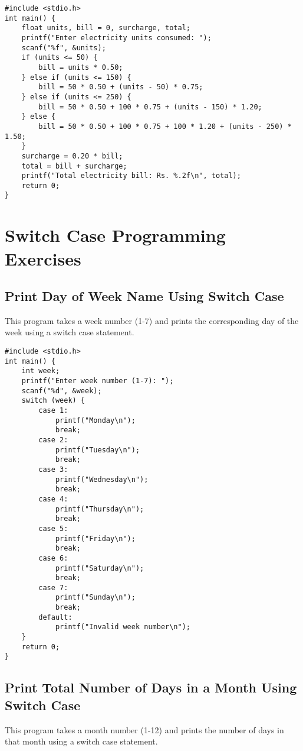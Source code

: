 \documentclass[a4paper,12pt]{article}
\begin{document}
\begin{lstlisting}[caption={Calculate Total Electricity Bill}]
#include <stdio.h>
int main() {
    float units, bill = 0, surcharge, total;
    printf("Enter electricity units consumed: ");
    scanf("%f", &units);
    if (units <= 50) {
        bill = units * 0.50;
    } else if (units <= 150) {
        bill = 50 * 0.50 + (units - 50) * 0.75;
    } else if (units <= 250) {
        bill = 50 * 0.50 + 100 * 0.75 + (units - 150) * 1.20;
    } else {
        bill = 50 * 0.50 + 100 * 0.75 + 100 * 1.20 + (units - 250) * 1.50;
    }
    surcharge = 0.20 * bill;
    total = bill + surcharge;
    printf("Total electricity bill: Rs. %.2f\n", total);
    return 0;
}
\end{lstlisting}

\newpage

\section{Switch Case Programming Exercises}

\subsection{Print Day of Week Name Using Switch Case}
This program takes a week number (1-7) and prints the corresponding day of the week using a switch case statement.

\begin{lstlisting}[caption={Print Day of Week Name Using Switch Case}]
#include <stdio.h>
int main() {
    int week;
    printf("Enter week number (1-7): ");
    scanf("%d", &week);
    switch (week) {
        case 1:
            printf("Monday\n");
            break;
        case 2:
            printf("Tuesday\n");
            break;
        case 3:
            printf("Wednesday\n");
            break;
        case 4:
            printf("Thursday\n");
            break;
        case 5:
            printf("Friday\n");
            break;
        case 6:
            printf("Saturday\n");
            break;
        case 7:
            printf("Sunday\n");
            break;
        default:
            printf("Invalid week number\n");
    }
    return 0;
}
\end{lstlisting}

\newpage

\subsection{Print Total Number of Days in a Month Using Switch Case}
This program takes a month number (1-12) and prints the number of days in that month using a switch case statement.
\end{document}
